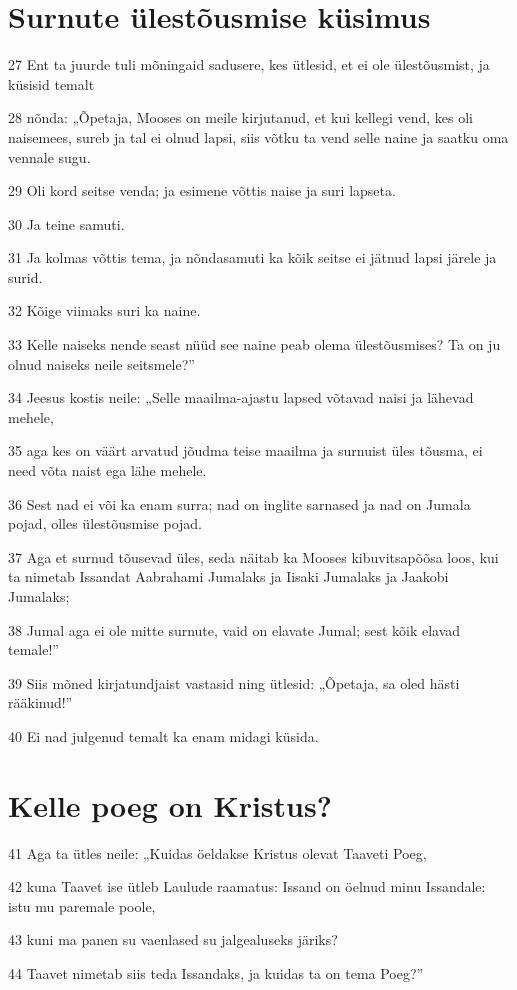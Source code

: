 \section*{Surnute ülestõusmise küsimus}

\par 27 Ent ta juurde tuli mõningaid sadusere, kes ütlesid, et ei ole ülestõusmist, ja küsisid temalt
\par 28 nõnda: „Õpetaja, Mooses on meile kirjutanud, et kui kellegi vend, kes oli naisemees, sureb ja tal ei olnud lapsi, siis võtku ta vend selle naine ja saatku oma vennale sugu.
\par 29 Oli kord seitse venda; ja esimene võttis naise ja suri lapseta.
\par 30 Ja teine samuti.
\par 31 Ja kolmas võttis tema, ja nõndasamuti ka kõik seitse ei jätnud lapsi järele ja surid.
\par 32 Kõige viimaks suri ka naine.
\par 33 Kelle naiseks nende seast nüüd see naine peab olema ülestõusmises? Ta on ju olnud naiseks neile seitsmele?”
\par 34 Jeesus kostis neile: „Selle maailma-ajastu lapsed võtavad naisi ja lähevad mehele,
\par 35 aga kes on väärt arvatud jõudma teise maailma ja surnuist üles tõusma, ei need võta naist ega lähe mehele.
\par 36 Sest nad ei või ka enam surra; nad on inglite sarnased ja nad on Jumala pojad, olles ülestõusmise pojad.
\par 37 Aga et surnud tõusevad üles, seda näitab ka Mooses kibuvitsapõõsa loos, kui ta nimetab Issandat Aabrahami Jumalaks ja Iisaki Jumalaks ja Jaakobi Jumalaks;
\par 38 Jumal aga ei ole mitte surnute, vaid on elavate Jumal; sest kõik elavad temale!”
\par 39 Siis mõned kirjatundjaist vastasid ning ütlesid: „Õpetaja, sa oled hästi rääkinud!”
\par 40 Ei nad julgenud temalt ka enam midagi küsida.

\section*{Kelle poeg on Kristus?}

\par 41 Aga ta ütles neile: „Kuidas öeldakse Kristus olevat Taaveti Poeg,
\par 42 kuna Taavet ise ütleb Laulude raamatus: Issand on öelnud minu Issandale: istu mu paremale poole,
\par 43 kuni ma panen su vaenlased su jalgealuseks järiks?
\par 44 Taavet nimetab siis teda Issandaks, ja kuidas ta on tema Poeg?”
